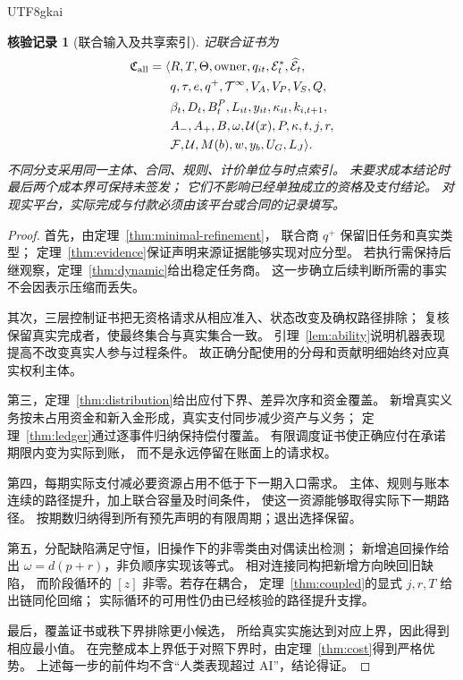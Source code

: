 \documentclass[12pt,a4paper,openany]{report}
\newtheorem{Certificate}{核验记录}[chapter]
\newcommand{\Cert}{\mathfrak C}
\begin{document}
\begin{CJK*}{UTF8}{gkai}
\begin{Certificate}[联合输入及共享索引]
记联合证书为
\[
\begin{aligned}
\Cert_{\rm all}=\langle&
R,T,\Theta,\operatorname{owner},q_{it},
\mathcal E_t^*,\widehat{\mathcal E}_t,\\
&q,\tau,e,q^+,\mathcal T^\infty,
V_A,V_P,V_S,Q,\\
&\beta_t,D_t,B_t^P,L_{it},y_{it},
\kappa_{it},k_{i,t+1},\\
&A_-,A_+,B,\omega,\mathcal U(x),
P,\kappa,t,j,r,\\
&\mathcal F,\mathcal U,M(b),w,y_b,U_G,L_J
\rangle .
\end{aligned}
\]
不同分支采用同一主体、合同、规则、计价单位与时点索引。
未要求成本结论时最后两个成本界可保持未签发；
它们不影响已经单独成立的资格及支付结论。
对现实平台，实际完成与付款必须由该平台或合同的记录填写。
\end{Certificate}

\begin{proof}
首先，由定理~\ref{thm:minimal-refinement}，
联合商 \(q^+\) 保留旧任务和真实类型；
定理~\ref{thm:evidence}保证声明来源证据能够实现对应分型。
若执行需保持后继观察，定理~\ref{thm:dynamic}给出稳定任务商。
这一步确立后续判断所需的事实不会因表示压缩而丢失。

其次，三层控制证书把无资格请求从相应准入、状态改变及确权路径排除；
复核保留真实完成者，使最终集合与真实集合一致。
引理~\ref{lem:ability}说明机器表现提高不改变真实人参与过程条件。
故正确分配使用的分母和贡献明细始终对应真实权利主体。

第三，定理~\ref{thm:distribution}给出应付下界、差异次序和资金覆盖。
新增真实义务按未占用资金和新入金形成，真实支付同步减少资产与义务；
定理~\ref{thm:ledger}通过逐事件归纳保持偿付覆盖。
有限调度证书使正确应付在承诺期限内变为实际到账，
而不是永远停留在账面上的请求权。

第四，每期实际支付减必要资源占用不低于下一期入口需求。
主体、规则与账本连续的路径提升，加上联合容量及时间条件，
使这一资源能够取得实际下一期路径。
按期数归纳得到所有预先声明的有限周期；退出选择保留。

第五，分配缺陷满足守恒，旧操作下的非零类由对偶读出检测；
新增追回操作给出 \(\omega=d(p+r)\)，非负顺序实现该等式。
相对连接同构把新增方向映回旧缺陷，
而阶段循环的 \([z]\) 非零。若存在耦合，
定理~\ref{thm:coupled}的显式 \(j,r,T\) 给出链同伦回缩；
实际循环的可用性仍由已经核验的路径提升支撑。

最后，覆盖证书或秩下界排除更小候选，
所给真实实施达到对应上界，因此得到相应最小值。
在完整成本上界低于对照下界时，由定理~\ref{thm:cost}得到严格优势。
上述每一步的前件均不含“人类表现超过 AI”，结论得证。
\end{proof}


\end{CJK*}
\end{document}
